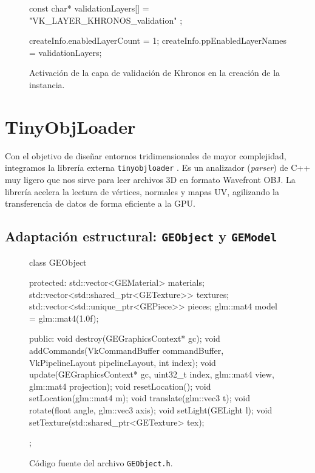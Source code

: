 \begin{figure}[!htbp]
    \centering
\begin{carbonbox}
const char* validationLayers[] = { "VK_LAYER_KHRONOS_validation" };

createInfo.enabledLayerCount = 1;
createInfo.ppEnabledLayerNames = validationLayers;
\end{carbonbox}
    \caption{Activación de la capa de validación de Khronos en la creación de la instancia.}
    \label{fig:codigoValidacion}
\end{figure}

\section{TinyObjLoader}
Con el objetivo de diseñar entornos tridimensionales de mayor complejidad, integramos la librería externa \texttt{tinyobjloader} \parencite{tinyobjloader}. 
Es un analizador (\textit{parser}) de C++ muy ligero que nos sirve para leer archivos 3D en formato Wavefront OBJ. 
La librería acelera la lectura de vértices, normales y mapas UV, agilizando la transferencia de datos de forma eficiente a la GPU.
 
\subsection{Adaptación estructural: \texttt{GEObject} y \texttt{GEModel}}


\begin{figure}[!htbp]
    \centering
\begin{carbonbox}
class GEObject
{
protected:
    std::vector<GEMaterial> materials;
    std::vector<std::shared_ptr<GETexture>> textures;
    std::vector<std::unique_ptr<GEPiece>> pieces;
    glm::mat4 model = glm::mat4(1.0f);

public:
    void destroy(GEGraphicsContext* gc);
    void addCommands(VkCommandBuffer commandBuffer, VkPipelineLayout pipelineLayout, int index);
    void update(GEGraphicsContext* gc, uint32_t index, glm::mat4 view, glm::mat4 projection);
    void resetLocation();
    void setLocation(glm::mat4 m);
    void translate(glm::vec3 t);
    void rotate(float angle, glm::vec3 axis);
    void setLight(GELight l);
    void setTexture(std::shared_ptr<GETexture> tex);
};
\end{carbonbox}
    \caption{Código fuente del archivo \texttt{GEObject.h}.}
    \label{fig:geobject_code}
\end{figure}


